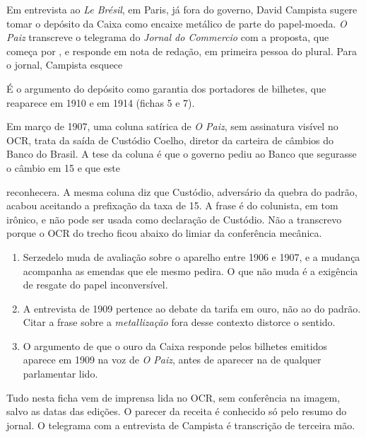 
Em entrevista ao \textit{Le Brésil}, em Paris, já fora do governo, David
Campista sugere tomar o depósito da Caixa como encaixe metálico de parte do
papel-moeda. \textit{O Paiz} transcreve o telegrama do \textit{Jornal do
Commercio} com a proposta, que começa por , e responde em nota de redação, em primeira pessoa
do plural. Para o jornal, Campista esquece


É o argumento do depósito como garantia dos portadores de bilhetes, que
reaparece em 1910 e em 1914 (fichas 5 e 7).


Em março de 1907, uma coluna satírica de \textit{O Paiz}, sem assinatura
visível no OCR, trata da saída de Custódio Coelho, diretor da carteira de
câmbios do Banco do Brasil. A tese da coluna é que o governo pediu ao Banco que
segurasse o câmbio em 15 e que este


reconhecera. A mesma coluna diz que Custódio, adversário da quebra do padrão,
acabou aceitando a prefixação da taxa de 15. A frase é do colunista, em tom
irônico, e não pode ser usada como declaração de Custódio. Não a transcrevo
porque o OCR do trecho ficou abaixo do limiar da conferência mecânica.


\begin{enumerate}[leftmargin=*,nosep]
\item Serzedelo muda de avaliação sobre o aparelho entre 1906 e 1907, e a
mudança acompanha as emendas que ele mesmo pedira. O que não muda é a
exigência de resgate do papel inconversível.
\item A entrevista de 1909 pertence ao debate da tarifa em ouro, não ao do
padrão. Citar a frase sobre a \textit{metallização} fora desse contexto
distorce o sentido.
\item O argumento de que o ouro da Caixa responde pelos bilhetes emitidos
aparece em 1909 na voz de \textit{O Paiz}, antes de aparecer na de qualquer
parlamentar lido.
\end{enumerate}


Tudo nesta ficha vem de imprensa lida no OCR, sem conferência na imagem, salvo
as datas das edições. O parecer da receita é conhecido só pelo resumo do
jornal. O telegrama com a entrevista de Campista é transcrição de terceira mão.
